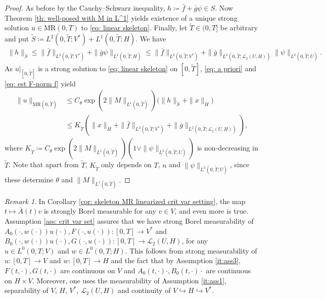 \documentclass{amsart}
\renewcommand{\MR}{\mathrm{MR}}
\newcommand{\UH}{\mathcal{L}_2(U,H)}
\newcommand{\<}{\langle}
\newcommand{\?}{\rangle}
\newcommand{\into}{\hookrightarrow}
\theoremstyle{plain}
\theoremstyle{remark}
\newtheorem{remark}[theorem]{Remark}
\theoremstyle{plain}
\numberwithin{equation}{section}
\begin{document}
\begin{proof}
As before by the Cauchy--Schwarz inequality, $h\coloneqq \bar{f}+\bar{g}\psi \in S$.
Now Theorem \ref{th: well-posed with M in L^1} yields existence of a unique strong solution $u\in\MR(0,T)$ to \eqref{eq: linear skeleton}.
Finally, let $\tilde{T}\in(0,T]$ be arbitrary and
put $\tilde{S}\coloneqq L^2(0,\tilde{T};V^*)+L^1(0,\tilde{T};H)$. We have
\begin{align}\label{eq: est F-norm f}
\|h\|_{\tilde{S}}\leq \|\bar{f}\|_{L^2(0,\tilde{T};V^*)}+\|\bar{g}\psi\|_{L^1(0,\tilde{T};H)}
\leq \|\bar{f}\|_{L^2(0,\tilde{T};V^*)}+\|\bar{g}\|_{L^2(0,\tilde{T};\UH)}\|\psi\|_{L^2(0,\tilde{T};U)}.
\end{align}
As $u|_{[0,\tilde{T}]}$ is a strong solution to \eqref{eq: linear skeleton} on $[0,\tilde{T}]$, \eqref{eq: a priori} and \eqref{eq: est F-norm f} yield
\begin{align*}
 \|u\|_{\MR(0,\tilde{T})}&\leq  C_{\theta}\exp(2\|M\|_{L^1(0,\tilde{T})})\big(\|h\|_{\tilde{S}}+\|x\|_H\big)\\
 &\leq  K_{\tilde{T}}\left(\|x\|_H+\|\bar{f}\|_{L^2(0,\tilde{T};V^*)} +\|\bar{g}\|_{L^2(0,\tilde{T};\UH)}\right),
\end{align*}
where $K_{\tilde{T}}\coloneqq C_{\theta}\exp(2\|M\|_{L^1(0,\tilde{T})})(1\vee\|\psi\|_{L^2(0,\tilde{T};U)})$ is non-decreasing in $\tilde{T}$. Note that apart from $\tilde{T}$, $K_{\tilde{T}}$ only depends on $T$, $n$ and $\|\psi\|_{L^2(0,\tilde{T};U)}$, since these determine $\theta$ and $\|M\|_{L^1(0,\tilde{T})}$.
\end{proof}

\begin{remark}\label{rem: mble A_0 B_0 F G}
In Corollary \ref{cor: skeleton MR linearized crit var setting}, the map $t\mapsto \bar{A}(t)v$ is strongly Borel measurable for any $v\in V$, and even more is true. Assumption \ref{ass: crit var set} assures that we have strong Borel measurability of $A_0(\cdot,w(\cdot))u(\cdot), F(\cdot,u(\cdot))\colon [0,T]\to V^*$ and $B_0(\cdot,w(\cdot))u(\cdot), G(\cdot,u(\cdot))\colon [0,T]\to \UH$, for any $u\in L^0(0,T;V)$ and $w\in L^0(0,T;H)$. This follows from strong measurability of $u\colon [0,T]\to V$ and $w:[0,T]\to H$ and the fact that by Assumption \ref{it:ass3}, $F(t,\cdot), G(t,\cdot)$ are continuous on $V$ and $A_0(t,\cdot)\cdot, B_0(t,\cdot)\cdot$ are continuous on $H\times V$. Moreover, one uses the measurability of Assumption \ref{it:ass1}, separability of $V$, $H$, $V^*$, $\UH$ and continuity of $V\into H\into V^*$.
\end{remark}
\end{document}
